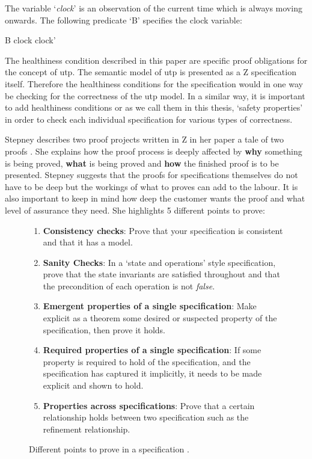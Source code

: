 \begin{exam}
The variable `\emph{clock}' is an observation of the current time which is
always moving onwards. The following predicate `B' specifies the clock variable:

\begin{zed}
B  clock \leq clock'
\end{zed}
\end{exam}

The healthiness condition described in this paper are specific proof obligations
for the concept of \Gls{utp}. The semantic model of \gls{utp} is presented as a Z
specification itself. Therefore the healthiness conditions for the specification would
in one way be checking for the correctness of the \gls{utp} model. In a similar
way, it is important to add healthiness conditions or as we call them in this
thesis, `safety properties' in order to check each individual specification for
various types of correctness.

Stepney describes two proof projects written in Z in her paper a tale of two
proofs \cite{stepney1998tale}. She explains how the proof process is deeply
affected by \textbf{why} something is being proved, \textbf{what} is being
proved and \textbf{how} the finished proof is to be presented. Stepney suggests
that the proofs for specifications themselves do not have to be deep but the
workings of what to proves can add to the labour. It is also important to keep
in mind how deep the customer wants the proof and what level of assurance they
need. She highlights 5 different points to prove:

\begin{figure}[H]
\begin{enumerate}
\item \textbf{Consistency checks}: Prove that your specification is consistent
and that it has a model.

\item \textbf{Sanity Checks}: In a `state and operations' style specification,
prove that the state invariants are satisfied throughout and that the
precondition of each operation is not \emph{false}.

\item \textbf{Emergent properties of a single specification}: Make explicit as a
theorem some desired or suspected property of the specification, then prove it
holds.

\item \textbf{Required properties of a single specification}: If some property
is required to hold of the specification, and the specification has captured it
implicitly, it needs to be made explicit and shown to hold.

\item \textbf{Properties across specifications}: Prove that a certain
relationship holds between two specification such as the refinement
relationship.
\end{enumerate}
\caption{Different points to prove in a specification \cite{stepney1998tale}. \label{fig:ptp}}
\end{figure}

